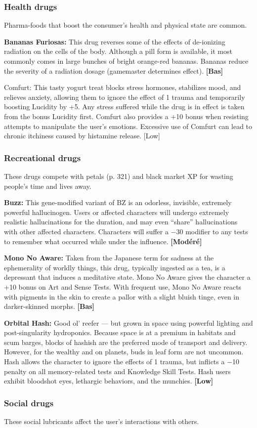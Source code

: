 {{\subsubsection{Health drugs} 

Pharma-foods that boost the consumer’s health and physical state are common. 

\textbf{Bananas Furiosas:} This drug reverses some of the effects of de-ionizing radiation on the cells of the body. Although a pill form is available, it most commonly comes in large bunches of bright orange-red bananas. Bananas reduce the severity of a radiation dosage (gamemaster determines effect). \textbf{[Bas]} 

Comfurt: This tasty yogurt treat blocks stress hormones, stabilizes mood, and relieves anxiety, allowing them to ignore the effect of 1 trauma and temporarily boosting Lucidity by +5. Any stress suffered while the drug is in effect is taken from the bonus Lucidity first. Comfurt also provides a +10 bonus when resisting attempts to manipulate the user’s emotions. Excessive use of Comfurt can lead to chronic itchiness caused by histamine release. [Low] 

\subsubsection{Recreational drugs} 

These drugs compete with petals (p. 321) and black market XP for wasting people’s time and lives away. 

\textbf{Buzz:} This gene-modified variant of BZ is an odorless, invisible, extremely powerful hallucinogen. Users or affected characters will undergo extremely realistic hallucinations for the duration, and may even ``share'' hallucinations with other affected characters. Characters will suffer a $-$30 modifier to any tests to remember what occurred while under the influence. \textbf{[Modéré]} 

\textbf{Mono No Aware:} Taken from the Japanese term for sadness at the ephemerality of worldly things, this drug, typically ingested as a tea, is a depressant that induces a meditative state. Mono No Aware gives the character a +10 bonus on Art and Sense Tests. With frequent use, Mono No Aware reacts with pigments in the skin to create a pallor with a slight bluish tinge, even in darker-skinned morphs. \textbf{[Bas]} 

\textbf{Orbital Hash:} Good ol’ reefer --- but grown in space using powerful lighting and post-singularity hydroponics. Because space is at a premium in habitats and scum barges, blocks of hashish are the preferred mode of transport and delivery. However, for the wealthy and on planets, buds in leaf form are not uncommon. Hash allows the character to ignore the effects of 1 trauma, but inflicts a $-$10 penalty on all memory-related tests and Knowledge Skill Tests. Hash users exhibit bloodshot eyes, lethargic behaviors, and the munchies. \textbf{[Low]}\subsubsection{Social drugs}These social lubricants affect the user’s interactions with others. 

}}
